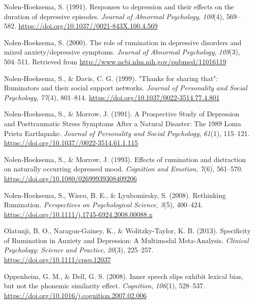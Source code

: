 \documentclass[a4paper,12pt,twoside,openright,oldfontcommands]{memoir}
\begin{document}
\leavevmode\hypertarget{ref-nolen-hoeksema_responses_1991}{}%
Nolen-Hoeksema, S. (1991). Responses to depression and their effects on the duration of depressive episodes. \emph{Journal of Abnormal Psychology}, \emph{100}(4), 569--582. \url{https://doi.org/10.1037//0021-843X.100.4.569}

\leavevmode\hypertarget{ref-Nolen-Hoeksema2000}{}%
Nolen-Hoeksema, S. (2000). The role of rumination in depressive disorders and mixed anxiety/depressive symptoms. \emph{Journal of Abnormal Psychology}, \emph{109}(3), 504--511. Retrieved from \url{http://www.ncbi.nlm.nih.gov/pubmed/11016119}

\leavevmode\hypertarget{ref-nolen-hoeksema_thanks_1999}{}%
Nolen-Hoeksema, S., \& Davis, C. G. (1999). "Thanks for sharing that": Ruminators and their social support networks. \emph{Journal of Personality and Social Psychology}, \emph{77}(4), 801--814. \url{https://doi.org/10.1037/0022-3514.77.4.801}

\leavevmode\hypertarget{ref-nolen-hoeksema_prospective_1991}{}%
Nolen-Hoeksema, S., \& Morrow, J. (1991). A Prospective Study of Depression and Posttraumatic Stress Symptoms After a Natural Disaster: The 1989 Loma Prieta Earthquake. \emph{Journal of Personality and Social Psychology}, \emph{61}(1), 115--121. \url{https://doi.org/10.1037//0022-3514.61.1.115}

\leavevmode\hypertarget{ref-nolen-hoeksema_effects_1993}{}%
Nolen-Hoeksema, S., \& Morrow, J. (1993). Effects of rumination and distraction on naturally occurring depressed mood. \emph{Cognition and Emotion}, \emph{7}(6), 561--570. \url{https://doi.org/10.1080/02699939308409206}

\leavevmode\hypertarget{ref-Nolen-Hoeksema2008}{}%
Nolen-Hoeksema, S., Wisco, B. E., \& Lyubomirsky, S. (2008). Rethinking Rumination. \emph{Perspectives on Psychological Science}, \emph{3}(5), 400--424. \url{https://doi.org/10.1111/j.1745-6924.2008.00088.x}

\leavevmode\hypertarget{ref-olatunji_specificity_2013}{}%
Olatunji, B. O., Naragon-Gainey, K., \& Wolitzky-Taylor, K. B. (2013). Specificity of Rumination in Anxiety and Depression: A Multimodal Meta-Analysis. \emph{Clinical Psychology: Science and Practice}, \emph{20}(3), 225--257. \url{https://doi.org/10.1111/cpsp.12037}

\leavevmode\hypertarget{ref-oppenheim_inner_2008}{}%
Oppenheim, G. M., \& Dell, G. S. (2008). Inner speech slips exhibit lexical bias, but not the phonemic similarity effect. \emph{Cognition}, \emph{106}(1), 528--537. \url{https://doi.org/10.1016/j.cognition.2007.02.006}
\end{document}
